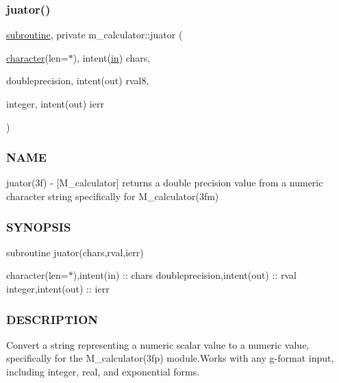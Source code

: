 \subsubsection{\texorpdfstring{juator()}{juator()}}
{\footnotesize\ttfamily \hyperlink{M__stopwatch_83_8txt_acfbcff50169d691ff02d4a123ed70482}{subroutine}, private m\+\_\+calculator\+::juator (\begin{DoxyParamCaption}\item[{\hyperlink{option__stopwatch_83_8txt_abd4b21fbbd175834027b5224bfe97e66}{character}(len=$\ast$), intent(\hyperlink{M__journal_83_8txt_afce72651d1eed785a2132bee863b2f38}{in})}]{chars,  }\item[{doubleprecision, intent(out)}]{rval8,  }\item[{integer, intent(out)}]{ierr }\end{DoxyParamCaption})\hspace{0.3cm}{\ttfamily [private]}}



\subsubsection*{N\+A\+ME}

juator(3f) -\/ \mbox{[}M\+\_\+calculator\mbox{]} returns a double precision value from a numeric character string specifically for M\+\_\+calculator(3fm) \subsubsection*{S\+Y\+N\+O\+P\+S\+IS}

subroutine juator(chars,rval,ierr)

character(len=$\ast$),intent(in) \+:\+: chars doubleprecision,intent(out) \+:\+: rval integer,intent(out) \+:\+: ierr

\subsubsection*{D\+E\+S\+C\+R\+I\+P\+T\+I\+ON}

Convert a string representing a numeric scalar value to a numeric value, specifically for the M\+\_\+calculator(3fp) module.\+Works with any g-\/format input, including integer, real, and exponential forms.


